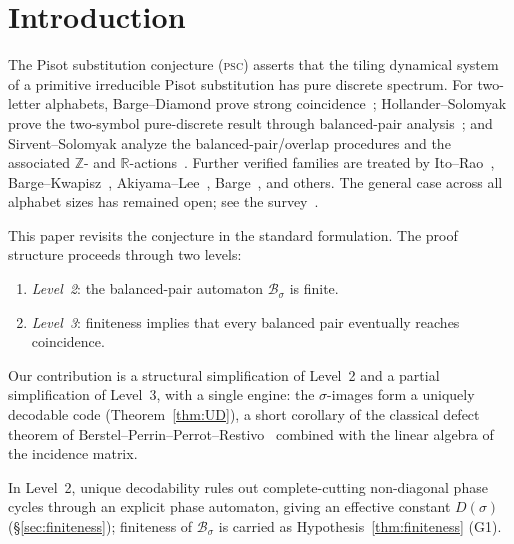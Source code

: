 \documentclass[11pt]{article}
\theoremstyle{plain}
\theoremstyle{definition}
\theoremstyle{remark}
\newcommand{\PSC}{\textsc{psc}}
\newcommand{\PDS}{pure discrete spectrum}
\newcommand{\B}{\mathcal{B}}
\begin{document}
\section{Introduction}\label{sec:intro}

The Pisot substitution conjecture (\PSC) asserts that the tiling dynamical system of a primitive irreducible Pisot substitution has \PDS. For two-letter alphabets, Barge--Diamond prove strong coincidence~\cite{BD}; Hollander--Solomyak prove the two-symbol pure-discrete result through balanced-pair analysis~\cite{HS}; and Sirvent--Solomyak analyze the balanced-pair/overlap procedures and the associated $\mathbb Z$- and $\mathbb R$-actions~\cite{SS}. Further verified families are treated by Ito--Rao~\cite{IR}, Barge--Kwapisz~\cite{BK}, Akiyama--Lee~\cite{AL}, Barge~\cite{Barge2018}, and others. The general case across all alphabet sizes has remained open; see the survey~\cite{ABBLS}.

This paper revisits the conjecture in the standard formulation. The proof structure proceeds through two levels:
\begin{enumerate}[label=(\arabic*)]
\item \emph{Level~2}: the balanced-pair automaton $\B_\sigma$ is finite.
\item \emph{Level~3}: finiteness implies that every balanced pair eventually reaches coincidence.
\end{enumerate}

Our contribution is a structural simplification of Level~2 and a partial simplification of Level~3, with a single engine: the $\sigma$-images form a uniquely decodable code (Theorem~\ref{thm:UD}), a short corollary of the classical defect theorem of Berstel--Perrin--Perrot--Restivo~\cite{BPPR} combined with the linear algebra of the incidence matrix.

In Level~2, unique decodability rules out complete-cutting non-diagonal phase cycles through an explicit phase automaton, giving an effective constant $D(\sigma)$ (\S\ref{sec:finiteness}); finiteness of $\B_\sigma$ is carried as Hypothesis~\ref{thm:finiteness} (G1).
\end{document}

